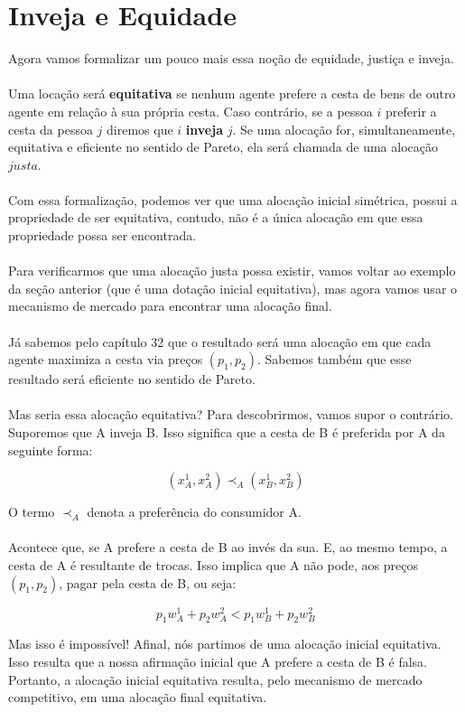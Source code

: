 \documentclass[a4paper,11pt,oneside]{book}
\theoremstyle{definition}
\theoremstyle{break}
\begin{document}
\section{Inveja e Equidade}

Agora vamos formalizar um pouco mais essa noção de equidade, justiça e inveja.
\\
\\
Uma locação será \textbf{equitativa} se nenhum agente prefere a cesta de bens de outro agente em relação à sua própria cesta. Caso contrário, se a pessoa $i$ preferir a cesta da pessoa $j$ diremos que $i$ \textbf{inveja} $j$. Se uma alocação for, simultaneamente, equitativa e eficiente no sentido de Pareto, ela será chamada de uma alocação $justa$.
\\
\\
Com essa formalização, podemos ver que uma alocação inicial simétrica, possui a propriedade de ser equitativa, contudo, não é a única alocação em que essa propriedade possa ser encontrada.
\\
\\
Para verificarmos que uma alocação justa possa existir, vamos voltar ao exemplo da seção anterior (que é uma dotação inicial equitativa), mas agora vamos usar o mecanismo de mercado para encontrar uma alocação final.
\\
\\
Já sabemos pelo capítulo 32 que o resultado será uma alocação em que cada agente maximiza a cesta via preços $(p_1,p_2)$. Sabemos também que esse resultado será eficiente no sentido de Pareto.
\\
\\
Mas seria essa alocação equitativa? Para descobrirmos, vamos supor o contrário. Suporemos que A inveja B. Isso significa que a cesta de B é preferida por A da seguinte forma:

$$ (x_A^1,x_A^2) \prec_A (x_B^1,x_B^2) $$

O termo $\prec_A$ denota a preferência do consumidor A.
\\
\\
Acontece que, se A prefere a cesta de B ao invés da sua. E, ao mesmo tempo, a cesta de A é resultante de trocas. Isso implica que A não pode, aos preços $(p_1,p_2)$, pagar pela cesta de B, ou seja:

$$ p_1w_A^1 + p_2w_A^2 < p_1w_B^1 + p_2w_B^2 $$

Mas isso é impossível! Afinal, nós partimos de uma alocação inicial equitativa. Isso resulta que a nossa afirmação inicial que A prefere a cesta de B é falsa. Portanto, a alocação inicial equitativa resulta, pelo mecanismo de mercado competitivo, em uma alocação final equitativa.
\end{document}
